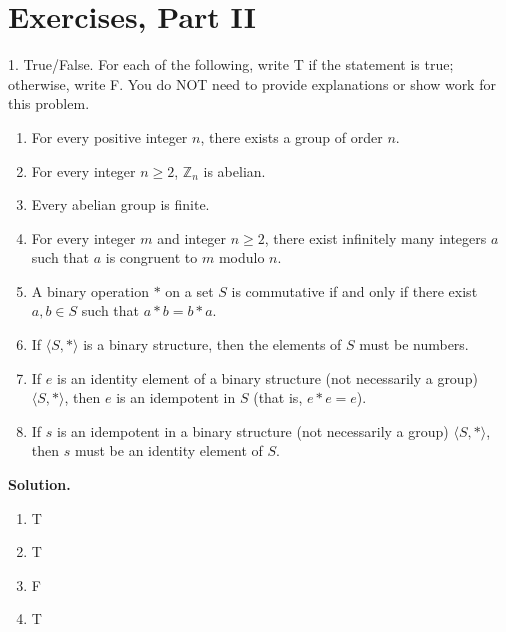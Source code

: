 \documentclass[10pt,]{book}
\theoremstyle{plain}
\theoremstyle{definition}
\theoremstyle{definition}
\theoremstyle{definition}
\theoremstyle{definition}
\numberwithin{equation}{section}
\def\Z{\mathbb{Z}}
\begin{document}
\section[{Exercises, Part II}]{Exercises, Part II}\label{exercises-3}
\begin{exerciselist}
\item[1.]\hypertarget{exercise-12}{}True/False. For each of the following, write T if the statement is true; otherwise, write F. You do NOT need to provide explanations or show work for this problem. \leavevmode%
\begin{enumerate}[label=(\alph*)]
\item\hypertarget{li-99}{}For every positive integer \(n\), there exists a group of order \(n\).%
\item\hypertarget{li-100}{}For every integer \(n\geq 2\), \(\Z_n\) is abelian.%
\item\hypertarget{li-101}{}Every abelian group is finite.%
\item\hypertarget{li-102}{}For every integer \(m\) and integer \(n\geq 2\), there exist infinitely many integers \(a\) such that \(a\) is congruent to \(m\) modulo \(n\).%
\item\hypertarget{li-103}{}A binary operation \(*\) on a set \(S\) is commutative if and only if there exist \(a,b\in S\) such that \(a*b=b*a\).%
\item\hypertarget{li-104}{}If \(\langle S, *\rangle\) is a binary structure, then the elements of \(S\) must be numbers.%
\item\hypertarget{li-105}{}If  \(e\) is an identity element of a binary structure (not necessarily a group) \(\langle S,*\rangle\), then \(e\) is an idempotent in \(S\) (that is, \(e*e=e\)).%
\item\hypertarget{li-106}{}If \(s\) is an idempotent in a binary structure (not necessarily a group) \(\langle S,*\rangle\), then \(s\) must be an identity element of \(S\).%
\end{enumerate}
%
\par\smallskip
\par\smallskip
\noindent\textbf{Solution.}\hypertarget{solution-12}{}\quad
\leavevmode%
\begin{multicols}{4}
\begin{enumerate}[label=(\alph*)]
\item\hypertarget{li-107}{}T%
\item\hypertarget{li-108}{}T%
\item\hypertarget{li-109}{}F%
\item\hypertarget{li-110}{}T%

\end{enumerate}
\end{multicols}
\end{exerciselist}
\end{document}
